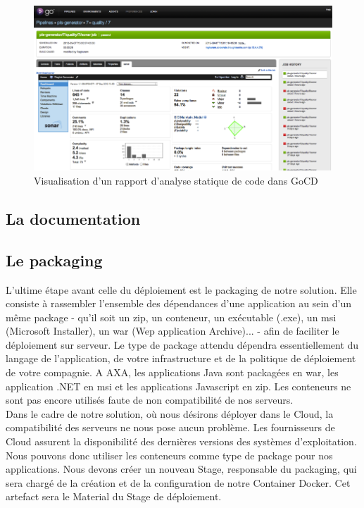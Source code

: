       \begin{figure}
        \begin{center}
          \includegraphics[scale=0.7]{images/GoCDSonar.png}
        \end{center}
        \caption{Visualisation d'un rapport d'analyse statique de code dans GoCD}
        \label{GoCDSonar}
      \end{figure}

      \subsection{La documentation}

      \subsection{Le packaging}
      L'ultime étape avant celle du déploiement est le packaging de notre solution. Elle consiste à rassembler l'ensemble des dépendances d'une application au sein d'un même package - qu'il soit un zip, un conteneur, un exécutable (.exe), un msi (Microsoft Installer), un war (Wep application Archive)... - afin de faciliter le déploiement sur serveur. Le type de package attendu dépendra essentiellement du langage de l'application, de votre infrastructure et de la politique de déploiement de votre compagnie. A AXA, les applications Java sont packagées en war, les application .NET en msi et les applications Javascript en zip. Les conteneurs ne sont pas encore utilisés faute de non compatibilité de nos serveurs.\\

      Dans le cadre de notre solution, où nous désirons déployer dans le Cloud, la compatibilité des serveurs ne nous pose aucun problème. Les fournisseurs de Cloud assurent la disponibilité des dernières versions des systèmes d'exploitation. Nous pouvons donc utiliser les conteneurs comme type de package pour nos applications. Nous devons créer un nouveau Stage, responsable du packaging, qui sera chargé de la création et de la configuration de notre Container Docker. Cet artefact sera le Material du Stage de déploiement.

